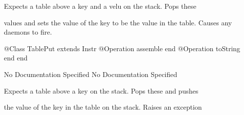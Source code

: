       Expects a table above a key and a velu on the stack. Pops these

      values and sets the value of the key to be the value in the table.
      Causes any daemons to fire.
\begin{Interface}
@Class TablePut extends Instr
  @Operation assemble end
  @Operation toString end
end
\end{Interface}
No Documentation Specified
No Documentation Specified

      Expects a table above a key on the stack. Pops these and pushes

      the value of the key in the table on the stack. Raises an exception

